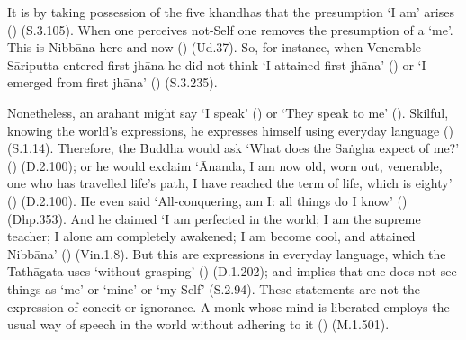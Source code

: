 
It is by taking possession of the five khandhas that the presumption `I am' arises () (S.3.105). When one perceives not-Self one removes the presumption of a `me'. This is Nibbāna here and now () (Ud.37). So, for instance, when Venerable Sāriputta entered first jhāna he did not think `I attained first jhāna' () or `I emerged from first jhāna' () (S.3.235).

Nonetheless, an arahant might say `I speak' () or `They speak to me' (). Skilful, knowing the world's expressions, he expresses himself using everyday language () (S.1.14). Therefore, the Buddha would ask `What does the Sa\.ngha expect of me?' () (D.2.100); or he would exclaim `Ānanda, I am now old, worn out, venerable, one who has travelled life's path, I have reached the term of life, which is eighty' () (D.2.100). He even said `All-conquering, am I: all things do I know' () (Dhp.353). And he claimed `I am perfected in the world; I am the supreme teacher; I alone am completely awakened; I am become cool, and attained Nibbāna' () (Vin.1.8). But this are expressions in everyday language, which the Tathāgata uses `without grasping' () (D.1.202); and  implies that one does not see things as `me' or `mine' or `my Self' (S.2.94). These statements are not the expression of conceit or ignorance. A monk whose mind is liberated employs the usual way of speech in the world without adhering to it () (M.1.501).
